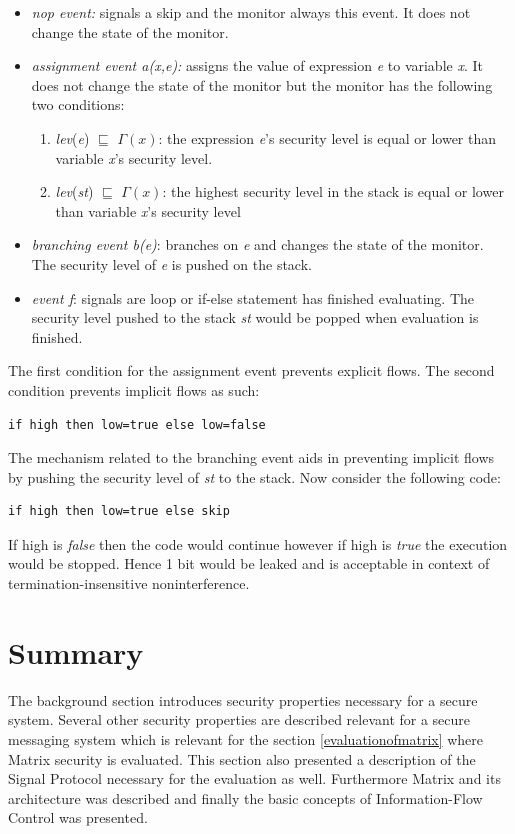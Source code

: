 \begin{itemize}
	\item \emph{nop event:} signals a skip and the monitor always this event. It does not change the state of the monitor.
	\item \emph{assignment event a(x,e):} assigns the value of expression \emph{e} to variable \emph{x}. It does not change the state of the monitor but the monitor has the following two conditions:
	\begin{enumerate}
		\item \emph{lev}(\emph{e}) $\sqsubseteq$ $\Gamma(x)$: the expression \emph{e}'s security level is equal or lower than variable \emph{x}'s security level.
		\item \emph{lev}(\emph{st}) $\sqsubseteq$ $\Gamma(x)$: the highest security level in the stack is equal or lower than variable \emph{x}'s security level 
	\end{enumerate} 
	\item \emph{branching event b(e)}: branches on \emph{e} and changes the state of the monitor. The security level of \emph{e} is pushed on the stack.
	\item \emph{event f}: signals are loop or if-else statement has finished evaluating. The security level pushed to the stack \emph{st} would be popped when evaluation is finished.
\end{itemize}

The first condition for the assignment event prevents explicit flows. The second condition prevents implicit flows as such: 

\begin{lstlisting}
if high then low=true else low=false
\end{lstlisting}

The mechanism related to the branching event aids in preventing implicit flows by pushing the security level of \emph{st} to the stack. Now consider the following code: 

\begin{lstlisting}
if high then low=true else skip
\end{lstlisting}

If high is \emph{false} then the code would continue however if high is \emph{true} the execution would be stopped. Hence 1 bit would be leaked and is acceptable in context of termination-insensitive noninterference.

\section{Summary}
The background section introduces security properties necessary for a secure system. Several other security properties are described relevant for a secure messaging system which is relevant for the section \ref{evaluationofmatrix} where Matrix security is evaluated. This section also presented a description of the Signal Protocol necessary for the evaluation as well. Furthermore Matrix and its architecture was described and finally the basic concepts of Information-Flow Control was presented.
